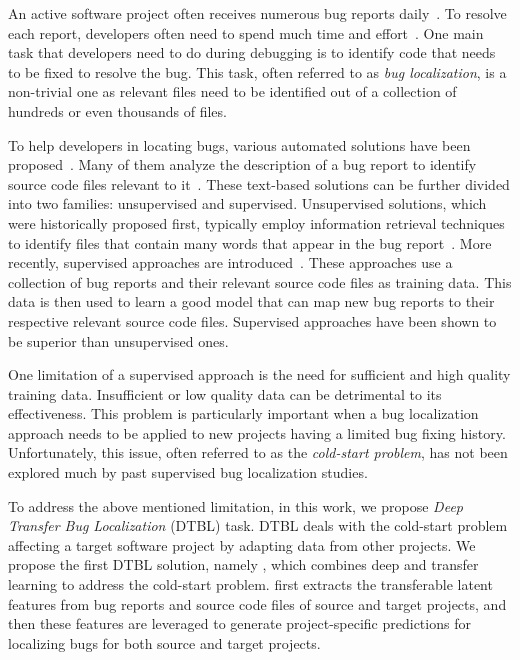 An active software project often receives numerous bug reports daily~\cite{AnvikHM05}. To resolve each report, developers often need to spend much time and effort~\cite{Tassey02}. One main task that developers need to do during debugging is to identify code that needs to be fixed to resolve the bug. This task, often referred to as {\em bug localization}, is a non-trivial one as relevant files need to be identified out of a collection of hundreds or even thousands of files.

To help developers in locating bugs, various automated solutions have been proposed~\cite{JonesH05,lukins2008source,rao2011retrieval,SahaLKP14,huo2016learning}. Many of them analyze the description of a bug report to identify source code files relevant to it~\cite{lukins2008source,rao2011retrieval,SahaLKP14,huo2016learning}. These text-based solutions can be further divided into two families: unsupervised and supervised. Unsupervised solutions, which were historically proposed first, typically employ information retrieval techniques to identify files that contain many words that appear in the bug report~\cite{lukins2008source,rao2011retrieval,SahaLKP14}. More recently, supervised approaches are introduced~\cite{huo2016learning}. These approaches use a collection of bug reports and their relevant source code files as training data. This data is then used to learn a good model that can map new bug reports to their respective relevant source code files. Supervised approaches have been shown to be superior than unsupervised ones.

One limitation of a supervised approach is the need for sufficient and high quality training data. Insufficient or low quality data can be detrimental to its effectiveness. This problem is particularly important when a bug localization approach needs to be applied to new projects having a limited bug fixing history. Unfortunately, this issue, often referred to as the {\em cold-start problem}, has not been explored much by past supervised bug localization studies.

To address the above mentioned limitation, in this work, we propose {\em Deep Transfer Bug Localization} (DTBL) task. DTBL deals with the cold-start problem affecting a target software project by adapting data from other projects. We propose the first DTBL solution, namely \TRANPCNN, which combines deep and transfer learning to address the cold-start problem. \TRANPCNN first extracts the transferable latent features from bug reports and source code files of source and target projects, and then these features are leveraged to generate project-specific predictions for localizing bugs for both source and target projects.  

